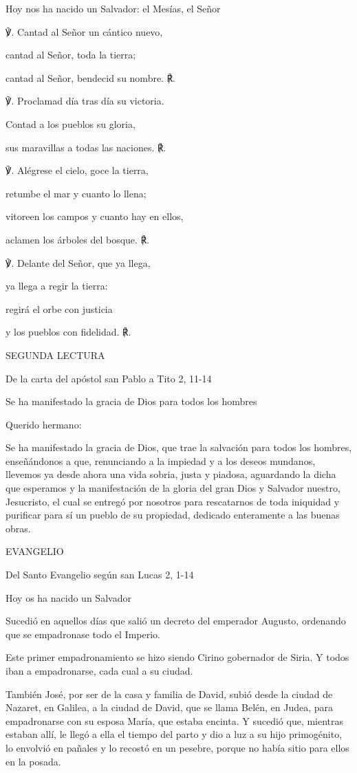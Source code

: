 \begin{body}
\begin{body}
Hoy nos ha nacido un Salvador: el Mesías, el Señor

℣. Cantad al Señor un cántico nuevo,

cantad al Señor, toda la tierra;

cantad al Señor, bendecid su nombre. ℟.

℣. Proclamad día tras día su victoria.

Contad a los pueblos su gloria,

sus maravillas a todas las naciones. ℟.

℣. Alégrese el cielo, goce la tierra,

retumbe el mar y cuanto lo llena;

vitoreen los campos y cuanto hay en ellos,

aclamen los árboles del bosque. ℟.

℣. Delante del Señor, que ya llega,

ya llega a regir la tierra:

regirá el orbe con justicia

y los pueblos con fidelidad. ℟.

SEGUNDA LECTURA

De la carta del apóstol san Pablo a Tito 2, 11-14

Se ha manifestado la gracia de Dios para todos los hombres

Querido hermano:

Se ha manifestado la gracia de Dios, que trae la salvación para todos
los hombres, enseñándonos a que, renunciando a la impiedad y a los
deseos mundanos, llevemos ya desde ahora una vida sobria, justa y
piadosa, aguardando la dicha que esperamos y la manifestación de la
gloria del gran Dios y Salvador nuestro, Jesucristo, el cual se entregó
por nosotros para rescatarnos de toda iniquidad y purificar para sí un
pueblo de su propiedad, dedicado enteramente a las buenas obras.

EVANGELIO

Del Santo Evangelio según san Lucas 2, 1-14

Hoy os ha nacido un Salvador

Sucedió en aquellos días que salió un decreto del emperador Augusto,
ordenando que se empadronase todo el Imperio.

Este primer empadronamiento se hizo siendo Cirino gobernador de Siria. Y
todos iban a empadronarse, cada cual a su ciudad.

También José, por ser de la casa y familia de David, subió desde la
ciudad de Nazaret, en Galilea, a la ciudad de David, que se llama Belén,
en Judea, para empadronarse con su esposa María, que estaba encinta. Y
sucedió que, mientras estaban allí, le llegó a ella el tiempo del parto
y dio a luz a su hijo primogénito, lo envolvió en pañales y lo recostó
en un pesebre, porque no había sitio para ellos en la posada.


\end{body}
\end{body}
